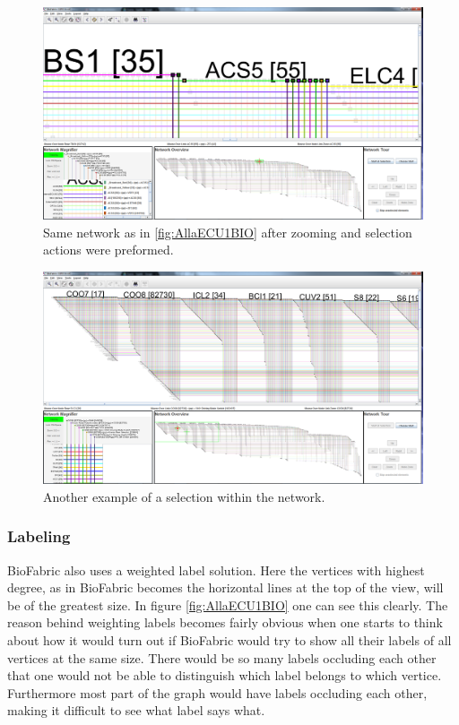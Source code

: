 \documentclass[a4paper,11pt]{kth-mag}
\begin{document}
 \newpage
\begin{figure}[!htbp]
	\centering
	\includegraphics[scale=0.3]{SesammVisualAppPics/BioFabric/Undirected/ECU/AllaECU2}
	\caption{Same network as in \ref{fig:AllaECU1BIO} after zooming and selection actions were preformed.}
	\label{fig:AllaECU2BIO}
\end{figure}

\begin{figure}[!htbp]
	\centering
	\includegraphics[scale=0.3]{SesammVisualAppPics/BioFabric/Undirected/ECU/AllaECU3}
	\caption{Another example of a selection within the network.}
	\label{fig:AllaECU3BIO}
\end{figure}
 
 \subsubsection{Labeling}
BioFabric also uses a weighted label solution. Here the vertices with highest degree, as in BioFabric becomes the horizontal lines at the top of the view, will be of the greatest size.  
In figure \ref{fig:AllaECU1BIO} one can see this clearly. The reason behind weighting labels becomes fairly obvious when one
starts to think about how it would turn out if BioFabric would try to show all their labels of all vertices at the same 
size. There would be so many labels occluding each other that one would not be able to distinguish which label
belongs to which vertice. Furthermore most part of the graph would have labels occluding each other, making it
difficult to see what label says what.
\end{document}
